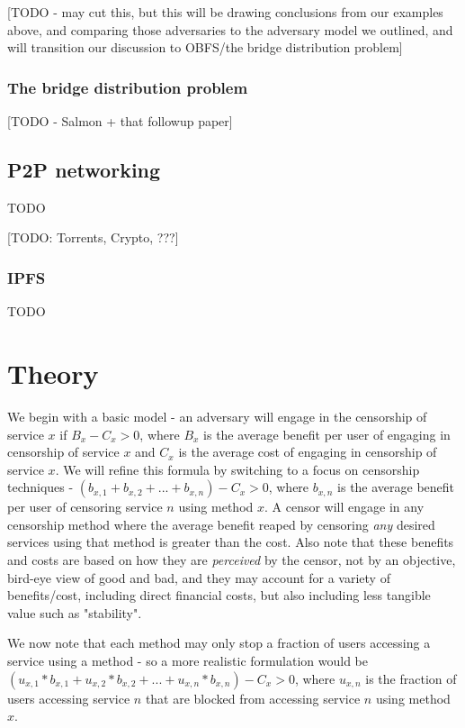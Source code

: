 \documentclass[12pt]{report}
\begin{document}
[TODO - may cut this, but this will be drawing conclusions from our examples above, and comparing those adversaries to the adversary model we outlined, and will transition our discussion to OBFS/the bridge distribution problem]

\subsection{The bridge distribution problem}
\label{distribution}

[TODO - Salmon + that followup paper]

\section{P2P networking}

TODO

[TODO: Torrents, Crypto, ???]

\subsection{IPFS}

TODO

\chapter{Theory}
\label{theory}

We begin with a basic model - an adversary will engage in the censorship of service $x$ if $B_x - C_x > 0$, where $B_x$ is the average benefit per user of engaging in censorship of service $x$ and $C_x$ is the average cost of engaging in censorship of service $x$. We will refine this formula by switching to a focus on censorship techniques - $(b_{x,1} + b_{x,2} + ... + b_{x,n}) - C_x > 0$, where $b_{x,n}$ is the average benefit per user of censoring service $n$ using method $x$. A censor will engage in any censorship method where the average benefit reaped by censoring \emph{any} desired services using that method is greater than the cost. Also note that these benefits and costs are based on how they are \emph{perceived} by the censor, not by an objective, bird-eye view of good and bad, and they may account for a variety of benefits/cost, including direct financial costs, but also including less tangible value such as "stability".

We now note that each method may only stop a fraction of users accessing a service using a method - so a more realistic formulation would be $(u_{x,1}*b_{x,1} + u_{x,2}*b_{x,2} + ... + u_{x,n}*b_{x,n}) - C_x > 0$, where $u_{x,n}$ is the fraction of users accessing service $n$ that are blocked from accessing service $n$ using method $x$.
\end{document}
